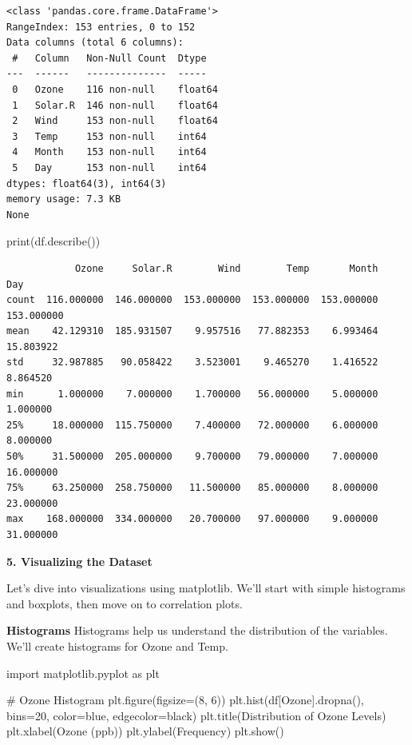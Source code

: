 \documentclass[
  letterpaper,
  DIV=11,
  numbers=noendperiod]{scrreprt}
\newenvironment{Shaded}{\begin{snugshade}}{\end{snugshade}}
\newcommand{\BuiltInTok}[1]{\textcolor[rgb]{0.00,0.23,0.31}{#1}}
\newcommand{\CommentTok}[1]{\textcolor[rgb]{0.37,0.37,0.37}{#1}}
\newcommand{\DecValTok}[1]{\textcolor[rgb]{0.68,0.00,0.00}{#1}}
\newcommand{\ImportTok}[1]{\textcolor[rgb]{0.00,0.46,0.62}{#1}}
\newcommand{\NormalTok}[1]{\textcolor[rgb]{0.00,0.23,0.31}{#1}}
\newcommand{\OperatorTok}[1]{\textcolor[rgb]{0.37,0.37,0.37}{#1}}
\newcommand{\StringTok}[1]{\textcolor[rgb]{0.13,0.47,0.30}{#1}}
\begin{document}
\begin{verbatim}
<class 'pandas.core.frame.DataFrame'>
RangeIndex: 153 entries, 0 to 152
Data columns (total 6 columns):
 #   Column   Non-Null Count  Dtype  
---  ------   --------------  -----  
 0   Ozone    116 non-null    float64
 1   Solar.R  146 non-null    float64
 2   Wind     153 non-null    float64
 3   Temp     153 non-null    int64  
 4   Month    153 non-null    int64  
 5   Day      153 non-null    int64  
dtypes: float64(3), int64(3)
memory usage: 7.3 KB
None
\end{verbatim}

\begin{Shaded}
\begin{Highlighting}[]
\BuiltInTok{print}\NormalTok{(df.describe())}
\end{Highlighting}
\end{Shaded}

\begin{verbatim}
            Ozone     Solar.R        Wind        Temp       Month         Day
count  116.000000  146.000000  153.000000  153.000000  153.000000  153.000000
mean    42.129310  185.931507    9.957516   77.882353    6.993464   15.803922
std     32.987885   90.058422    3.523001    9.465270    1.416522    8.864520
min      1.000000    7.000000    1.700000   56.000000    5.000000    1.000000
25%     18.000000  115.750000    7.400000   72.000000    6.000000    8.000000
50%     31.500000  205.000000    9.700000   79.000000    7.000000   16.000000
75%     63.250000  258.750000   11.500000   85.000000    8.000000   23.000000
max    168.000000  334.000000   20.700000   97.000000    9.000000   31.000000
\end{verbatim}

\textbf{5. Visualizing the Dataset}

Let's dive into visualizations using matplotlib. We'll start with simple
histograms and boxplots, then move on to correlation plots.

\textbf{Histograms} Histograms help us understand the distribution of
the variables. We'll create histograms for Ozone and Temp.

\begin{Shaded}
\begin{Highlighting}[]
\ImportTok{import}\NormalTok{ matplotlib.pyplot }\ImportTok{as}\NormalTok{ plt}

\CommentTok{\# Ozone Histogram}
\NormalTok{plt.figure(figsize}\OperatorTok{=}\NormalTok{(}\DecValTok{8}\NormalTok{, }\DecValTok{6}\NormalTok{))}
\NormalTok{plt.hist(df[}\StringTok{\textquotesingle{}Ozone\textquotesingle{}}\NormalTok{].dropna(), bins}\OperatorTok{=}\DecValTok{20}\NormalTok{, color}\OperatorTok{=}\StringTok{\textquotesingle{}blue\textquotesingle{}}\NormalTok{, edgecolor}\OperatorTok{=}\StringTok{\textquotesingle{}black\textquotesingle{}}\NormalTok{)}
\NormalTok{plt.title(}\StringTok{\textquotesingle{}Distribution of Ozone Levels\textquotesingle{}}\NormalTok{)}
\NormalTok{plt.xlabel(}\StringTok{\textquotesingle{}Ozone (ppb)\textquotesingle{}}\NormalTok{)}
\NormalTok{plt.ylabel(}\StringTok{\textquotesingle{}Frequency\textquotesingle{}}\NormalTok{)}
\NormalTok{plt.show()}
\end{Highlighting}
\end{Shaded}
\end{document}
